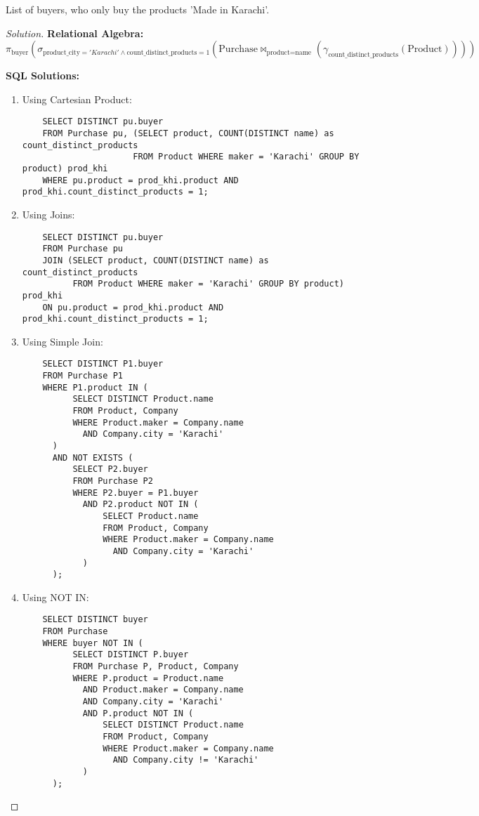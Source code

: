 \documentclass[10pt]{article}
\newenvironment{problem}[2][Problem]{\begin{trivlist}
\item[\hskip \labelsep {\bfseries #1}\hskip \labelsep {\bfseries #2.}]}{\end{trivlist}}
\begin{document}
\begin{problem}{6}
List of buyers, who only buy the products 'Made in Karachi'.
\end{problem}

\begin{proof}[Solution]
\textbf{Relational Algebra:}
\[
\pi_{\text{buyer}}\left(\sigma_{\text{product\_city} = 'Karachi' \land \text{count\_distinct\_products} = 1}(\text{Purchase} \bowtie_{\text{product} = \text{name}} (\gamma_{\text{count\_distinct\_products}}(\text{Product})))
\right)
\]

\textbf{SQL Solutions:}
\begin{enumerate}
    \item Using Cartesian Product:
    \begin{verbatim}
    SELECT DISTINCT pu.buyer
    FROM Purchase pu, (SELECT product, COUNT(DISTINCT name) as count_distinct_products
                      FROM Product WHERE maker = 'Karachi' GROUP BY product) prod_khi
    WHERE pu.product = prod_khi.product AND prod_khi.count_distinct_products = 1;
    \end{verbatim}
    
    \item Using Joins:
    \begin{verbatim}
    SELECT DISTINCT pu.buyer
    FROM Purchase pu
    JOIN (SELECT product, COUNT(DISTINCT name) as count_distinct_products
          FROM Product WHERE maker = 'Karachi' GROUP BY product) prod_khi
    ON pu.product = prod_khi.product AND prod_khi.count_distinct_products = 1;
    \end{verbatim}

    \item Using Simple Join:
    \begin{verbatim}
    SELECT DISTINCT P1.buyer
    FROM Purchase P1
    WHERE P1.product IN (
          SELECT DISTINCT Product.name
          FROM Product, Company
          WHERE Product.maker = Company.name
            AND Company.city = 'Karachi'
      )
      AND NOT EXISTS (
          SELECT P2.buyer
          FROM Purchase P2
          WHERE P2.buyer = P1.buyer
            AND P2.product NOT IN (
                SELECT Product.name
                FROM Product, Company
                WHERE Product.maker = Company.name
                  AND Company.city = 'Karachi'
            )
      );
    \end{verbatim}
    
    \item Using NOT IN:
    \begin{verbatim}
    SELECT DISTINCT buyer
    FROM Purchase
    WHERE buyer NOT IN (
          SELECT DISTINCT P.buyer
          FROM Purchase P, Product, Company
          WHERE P.product = Product.name
            AND Product.maker = Company.name
            AND Company.city = 'Karachi'
            AND P.product NOT IN (
                SELECT DISTINCT Product.name
                FROM Product, Company
                WHERE Product.maker = Company.name
                  AND Company.city != 'Karachi'
            )
      );
    \end{verbatim}
    

\end{enumerate}
\end{proof}
\end{document}
